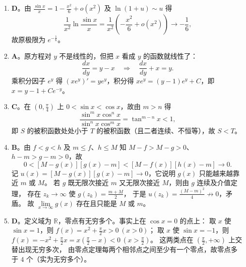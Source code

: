 \begin{enumerate}
{\begin{enumerate}
	B 不正确：取 $x_1=\sqrt{\frac{\pi}{2}}$ 得 $f\left(x_1\right)=\frac{1}{x_1}>0$，
	取 $x_2=\sqrt{\frac{3\pi}{2}}$ 得 $f\left(x_2\right)=-\frac{1}{x_2}<0$。
	由两端极限为 $0$，可取 $0<\alpha<x_1<x_2<\beta$，使 $x\in(0,\alpha)\cup(\beta,+\infty)$ 时
	$|f(x)|<\frac12\min\left\{f\left(x_1\right),\left|f\left(x_2\right)\right|\right\}$。
	$f$ 在闭区间 $[\alpha,\beta]$ 上必取到最大值与最小值，而区间外的值被夹在两者之间，
	故它们就是 $f$ 在 $(0,+\infty)$ 上的最大值与最小值，即最值是存在的。

	\item
	\textbf{D}。由 $\frac{\sin x}{x}=1-\frac{x^2}{6}+o\left(x^2\right)$ 及 $\ln(1+u)\sim u$ 得
	\[
	\frac{1}{x^2}\ln\frac{\sin x}{x}
	=\frac{1}{x^2}\left(-\frac{x^2}{6}+o\left(x^2\right)\right)\to-\frac16 ,
	\]
	故原极限为 $e^{-\frac16}$。

	\item
	\textbf{A}。原方程对 $y$ 不是线性的，但把 $x$ 看成 $y$ 的函数就线性了：
	\[
	\frac{dx}{dy}=y-x\quad\Longrightarrow\quad\frac{dx}{dy}+x=y .
	\]
	乘积分因子 $e^{y}$ 得 $\left(xe^{y}\right)'=ye^{y}$，积分得
	$xe^{y}=(y-1)e^{y}+C$，即 $x=y-1+Ce^{-y}$。

	\item
	\textbf{C}。在 $\left(0,\frac{\pi}{4}\right)$ 上 $0<\sin x<\cos x$，故由 $m>n$ 得
	\[
	\frac{\sin^mx\cos^nx}{\sin^nx\cos^mx}=\tan^{m-n}x<1 ,
	\]
	即 $S$ 的被积函数处处小于 $T$ 的被积函数（且二者连续、不恒等），故 $S<T$。

	\item
	\textbf{B}。由 $f<g<h$ 及 $m\leqslant f$、$h\leqslant M$ 知 $M-f>M-g>0$、$h-m>g-m>0$，故
	\[
	0<\left[M-g(x)\right]\left[g(x)-m\right]<\left[M-f(x)\right]\left[h(x)-m\right]\to0 .
	\]
	记 $u(x)=\left[M-g(x)\right]\left[g(x)-m\right]\to0$，它说明 $g(x)$ 只能越来越靠近 $m$ 或 $M$。
	若 $g$ 既无限次接近 $m$ 又无限次接近 $M$，则由 $g$ 连续及介值定理，
	存在 $z_k\to\infty$ 使 $g\left(z_k\right)=\frac{m+M}{2}$，
	于是 $u\left(z_k\right)=\frac{(M-m)^2}{4}\not\to0$，矛盾。
	故 $\lim\limits_{x\to\infty}g(x)$ 存在且只能是 $M$ 或 $m$。

	\item
	\textbf{D}。定义域为 $\mathbb{R}$，零点有无穷多个。事实上在 $\cos x=0$ 的点上：
	取 $x$ 使 $\sin x=1$，则 $f(x)=x^2+\frac{\pi}{2}x>0\ (x>0)$；
	取 $x$ 使 $\sin x=-1$，则 $f(x)=-x^2+\frac{\pi}{2}x=x\left(\frac{\pi}{2}-x\right)<0\ \left(x>\frac{\pi}{2}\right)$。
	这两类点在 $\left(\frac{\pi}{2},+\infty\right)$ 上交替出现无穷多次，
	由零点定理每两个相邻点之间至少有一个零点，故零点多于 $4$ 个（实为无穷多个）。


\end{enumerate}}
\end{enumerate}
